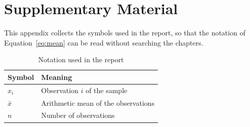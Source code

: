 \chapter{Supplementary Material}
\label{app:supplementary}

This appendix collects the symbols used in the report, so that the notation
of Equation~\eqref{eq:mean} can be read without searching the chapters.

\begin{table}[H]
  \centering
  \caption{Notation used in the report}
  \label{tab:notation}
  \begin{tabular}{@{}ll@{}}
    \toprule
    Symbol & Meaning \\
    \midrule
    $x_i$ & Observation $i$ of the sample \\
    $\bar{x}$ & Arithmetic mean of the observations \\
    $n$ & Number of observations \\
    \bottomrule
  \end{tabular}
\end{table}

